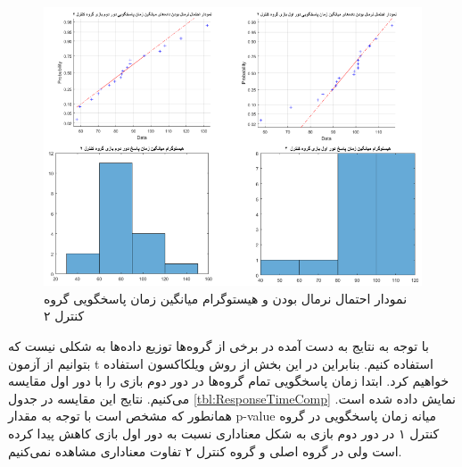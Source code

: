 \documentclass[twoside, a4paper,11pt]{book}
\numberwithin{equation}{chapter}
\numberwithin{table}{chapter}
\numberwithin{figure}{chapter}
\numberwithin{equation}{chapter}
\begin{document}
\begin{figure}
\centering
\includegraphics[scale=0.5]{Figures/p3tNorm.png}
\caption{\label{fig:p3tNorm}
نمودار احتمال نرمال بودن و هیستوگرام میانگین زمان پاسخگویی گروه کنترل ۲
}
\end{figure}

با توجه به نتایج به دست آمده در برخی از گروه‌ها توزیع داده‌ها به شکلی نیست که بتوانیم از آزمون t استفاده کنیم. بنابراین در این بخش از روش ویلکاکسون استفاده خواهیم کرد.
ابتدا زمان پاسخگویی تمام گروه‌ها در دور دوم بازی را با دور اول مقایسه می‌کنیم. نتایج این مقایسه در جدول \ref{tbl:ResponseTimeComp} نمایش داده شده است. همانطور که مشخص است با توجه به مقدار p-value میانه زمان پاسخگویی در گروه کنترل ۱ در دور دوم بازی به شکل معناداری نسبت به دور اول بازی کاهش پیدا کرده است ولی در گروه اصلی و گروه کنترل ۲ تفاوت معناداری مشاهده نمی‌کنیم.
\begin{table}[]
\end{table}
\end{document}
